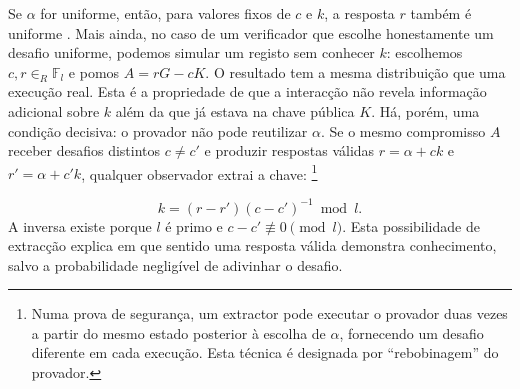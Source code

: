 Se \(\alpha\) for uniforme, então, para valores fixos de \(c\) e \(k\), a
resposta \(r\) também é uniforme \cite{SCOZZAFAVA1993313}. Mais ainda, no caso
de um verificador que escolhe honestamente um desafio uniforme, podemos simular
um registo sem conhecer \(k\):
 escolhemos \(c,r\in_R\mathbb{F}_l\) e pomos
\(A=rG-cK\). O resultado tem a mesma distribuição que uma execução real. Esta
é a propriedade de que a interacção não revela informação adicional sobre
\(k\) além da que já estava na chave pública \(K\).
Há, porém, uma condição decisiva: o provador não pode reutilizar \(\alpha\).
Se o mesmo compromisso \(A\) receber desafios distintos \(c\ne c'\) e produzir
respostas válidas
\(r=\alpha+ck\) e \(r'=\alpha+c'k\), qualquer observador extrai a chave:
\footnote{Numa prova de segurança, um extractor pode executar o provador duas
vezes a partir do mesmo estado posterior à escolha de \(\alpha\), fornecendo um
desafio diferente em cada execução. Esta técnica é designada por
``rebobinagem'' do provador.}

\[
k=(r-r')(c-c')^{-1}\bmod l.
\]
A inversa existe porque \(l\) é primo e \(c-c'\not\equiv0\pmod l\). Esta
possibilidade de extracção explica em que sentido uma resposta válida demonstra
conhecimento, salvo a probabilidade negligível de adivinhar o desafio.

